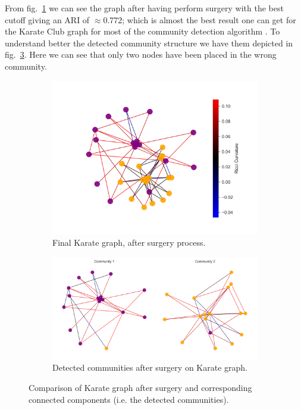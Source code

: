 From fig.~\ref{fig:Karate_Communities_a} we can see the graph after having perform surgery with the best cutoff giving an ARI of $\approx$0.772; which is almost the best result one can get for the Karate Club graph for most of the community detection algorithm \cite{Ni:communitydetectionnetworksricci}. To understand better the detected community structure we have them depicted in fig.~\ref{fig:Karate_Communities_b}. Here we can see that only two nodes have been placed in the wrong community.
\begin{figure}
    \centering
    \begin{subfigure}{0.45\textwidth}
        \centering
        \includegraphics[width=\textwidth]{../KarateClubResults/After Surgery.png}
        \caption{Final Karate graph, after surgery process.}
        \label{fig:Karate_Communities_a}
    \end{subfigure}
    \hfill
    \begin{subfigure}{0.45\textwidth}
        \centering
        \includegraphics[width=\textwidth]{../KarateClubResults/Detected Communities.png}
        \caption{Detected communities after surgery on Karate graph.}
        \label{fig:Karate_Communities_b}
    \end{subfigure}
    \caption{Comparison of Karate graph after surgery and corresponding connected components (i.e. the detected communities).}
\end{figure}

